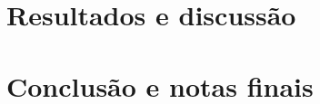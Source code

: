 \documentclass[10pt,a4paper,oneside]{article}
\begin{document}
\section{Resultados e discussão}
\label{sec:res}


\section{Conclusão e notas finais}
\label{sec:con}

\cite{shimbel1953structural}



\end{document}

